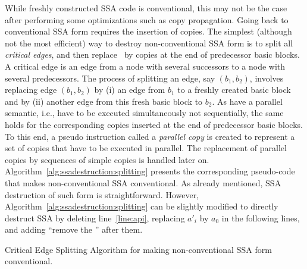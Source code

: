 {While freshly constructed SSA code is conventional, 
this may not be the case after performing some optimizations 
such as copy propagation.
Going back to conventional SSA form requires the insertion of copies.
%
The simplest (although not the most efficient) way to destroy non-conventional SSA form is to split all \textit{critical edges}, and then replace \phifuns\ by copies at the end of predecessor basic blocks. 
A critical edge is an edge from a node with several successors to a node with several predecessors.
The process of splitting an edge, say $(b_1,b_2)$,
involves replacing edge $(b_1, b_2)$ by (i) an
edge from $b_1$ to a freshly created basic block 
and by (ii) another edge from this fresh basic block to $b_2$. 
As \phifuns have a parallel semantic, i.e., have to be executed simultaneously not sequentially, the same holds for the corresponding copies inserted at the end of predecessor basic blocks. To this end, a pseudo instruction called a \emph{parallel copy} is created to represent a set of copies that have to be executed in parallel.
The replacement of parallel copies by sequences of simple copies is handled later on.
Algorithm~\ref{alg:ssadestruction:splitting} presents
the corresponding pseudo-code that makes non-conventional SSA conventional. 
As already mentioned, SSA destruction of such form is straightforward. However, 
Algorithm~\ref{alg:ssadestruction:splitting} can be slightly modified to 
directly destruct SSA by deleting line~\ref{line:api}, replacing $a'_i$ by $a_0$ in the 
following lines, and adding ``remove the \phifun'' after them.

\begin{algorithm}
\LinesNumbered
\caption{\label{alg:ssadestruction:splitting}Critical Edge Splitting Algorithm 
for making non-conventional SSA form conventional.}
\end{algorithm}



}
